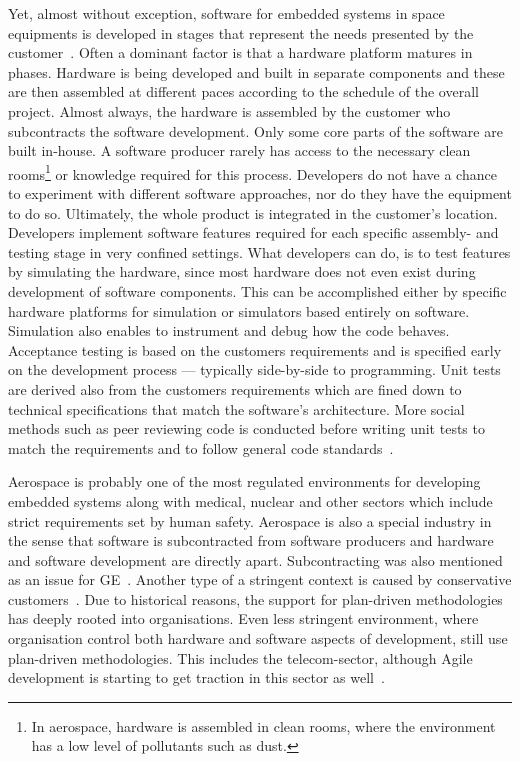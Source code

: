 \documentclass[english]{tktltiki2}
\begin{document}
Yet, almost without exception, software for embedded systems in space equipments is developed in stages that represent the needs presented by the customer~\cite{Hol15b}. Often a dominant factor is that a hardware platform matures in phases. Hardware is being developed and built in separate components and these are then assembled at different paces according to the schedule of the overall project. Almost always, the hardware is assembled by the customer who subcontracts the software development. Only some core parts of the software are built in-house. A software producer rarely has access to the necessary clean rooms\footnote{In aerospace, hardware is assembled in clean rooms, where the environment has a low level of pollutants such as dust.} or knowledge required for this process. Developers do not have a chance to experiment with different software approaches, nor do they have the equipment to do so. Ultimately, the whole product is integrated in the customer’s location. Developers implement software features required for each specific assembly- and testing stage in very confined settings. What developers can do, is to test features by simulating the hardware, since most hardware does not even exist during development of software components. This can be accomplished either by specific hardware platforms for simulation or simulators based entirely on software. Simulation also enables to instrument and debug how the code behaves. Acceptance testing is based on the customers requirements and is specified early on the development process — typically side-by-side to programming. Unit tests are derived also from the customers requirements which are fined down to technical specifications that match the software’s architecture. More social methods such as peer reviewing code is conducted before writing unit tests to match the requirements and to follow general code standards~\cite{Hol15b}.

Aerospace is probably one of the most regulated environments for developing embedded systems along with medical, nuclear and other sectors which include strict requirements set by human safety. Aerospace is also a special industry in the sense that software is subcontracted from software producers and hardware and software development are directly apart. Subcontracting was also mentioned as an issue for GE~\cite{BT15}. Another type of a stringent context is caused by conservative customers~\cite{Koi15}. Due to historical reasons, the support for plan-driven methodologies has deeply rooted into organisations. Even less stringent environment, where organisation control both hardware and software aspects of development, still use plan-driven methodologies. This includes the telecom-sector, although Agile development is starting to get traction in this sector as well~\cite{LTR14}.
\end{document}
